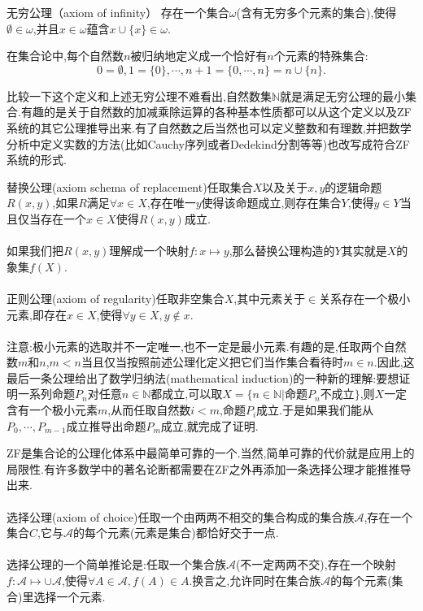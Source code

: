 无穷公理（axiom of infinity） 存在一个集合$\omega$(含有无穷多个元素的集合),使得$\emptyset\in\omega$,并且$x\in\omega$蕴含$x\cup\{x\}\in\omega$.

在集合论中,每个自然数$n$被归纳地定义成一个恰好有$n$个元素的特殊集合:
\begin{equation}
0=\emptyset,1=\{0\},\cdots,n+1=\{0,\cdots,n\} = n\cup\{n\}.
\end{equation}	

比较一下这个定义和上述无穷公理不难看出,自然数集$\mathbb{N}$就是满足无穷公理的最小集合.有趣的是关于自然数的加减乘除运算的各种基本性质都可以从这个定义以及ZF系统的其它公理推导出来.有了自然数之后当然也可以定义整数和有理数,并把数学分析中定义实数的方法(比如Cauchy序列或者Dedekind分割等等)也改写成符合ZF系统的形式.



替换公理(axiom schema of replacement)任取集合$X$以及关于$x,y$的逻辑命题$R(x,y)$,如果$R$满足$\forall x\in X$,存在唯一$y$使得该命题成立,则存在集合$Y$,使得$y\in Y$当且仅当存在一个$x\in X$使得$R(x,y)$成立.
\\ \hspace*{\fill} \\%
如果我们把$R(x,y)$理解成一个映射$f:x\mapsto y$,那么替换公理构造的$Y$其实就是$X$的象集$f(X)$.
\\ \hspace*{\fill} \\%
正则公理(axiom of regularity)任取非空集合$X$,其中元素关于$\in$关系存在一个极小元素,即存在$x\in X$,使得$\forall y\in X,y\notin x$.
\\ \hspace*{\fill} \\%
注意:极小元素的选取并不一定唯一,也不一定是最小元素.有趣的是,任取两个自然数$m$和$n$,$m<n$当且仅当按照前述公理化定义把它们当作集合看待时$m\in n$.因此,这最后一条公理给出了数学归纳法(mathematical induction)的一种新的理解:要想证明一系列命题$P_n$对任意$n\in\mathbb{N}$都成立,可以取$X=\{ n\in\mathbb{N}|\text{命题}P_n\text{不成立} \}$,则$X$一定含有一个极小元素$m$,从而任取自然数$i<m$,命题$P_i$成立.于是如果我们能从$P_0,\cdots,P_{m-1}$成立推导出命题$P_m$成立,就完成了证明.




ZF是集合论的公理化体系中最简单可靠的一个.当然,简单可靠的代价就是应用上的局限性.有许多数学中的著名论断都需要在ZF之外再添加一条选择公理才能推推导出来.
\\ \hspace*{\fill} \\%
选择公理(axiom of choice)任取一个由两两不相交的集合构成的集合族$\mathcal{A}$,存在一个集合$C$,它与$\mathcal{A}$的每个元素(元素是集合)都恰好交于一点.
\\ \hspace*{\fill} \\%
选择公理的一个简单推论是:任取一个集合族$\mathcal{A}$(不一定两两不交),存在一个映射$f:\mathcal{A}\mapsto\cup\mathcal{A}$,使得$\forall A\in\mathcal{A},f(A)\in A$.换言之,允许同时在集合族$\mathcal{A}$的每个元素(集合)里选择一个元素.






